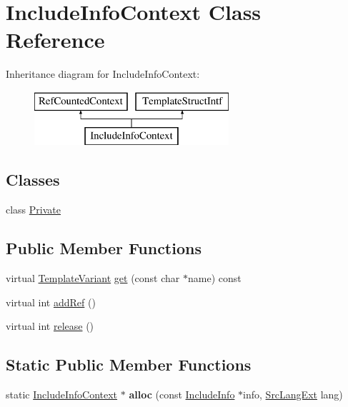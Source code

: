 \hypertarget{class_include_info_context}{}\section{Include\+Info\+Context Class Reference}
\label{class_include_info_context}
Inheritance diagram for Include\+Info\+Context\+:\begin{figure}[H]
\begin{center}
\leavevmode
\includegraphics[height=2.000000cm]{class_include_info_context}
\end{center}
\end{figure}
\subsection*{Classes}
\begin{DoxyCompactItemize}
\item 
class \mbox{\hyperlink{class_include_info_context_1_1_private}{Private}}
\end{DoxyCompactItemize}
\subsection*{Public Member Functions}
\begin{DoxyCompactItemize}
\item 
virtual \mbox{\hyperlink{class_template_variant}{Template\+Variant}} \mbox{\hyperlink{class_include_info_context_a16525103c9f37d8749b49211ae51e6e1}{get}} (const char $\ast$name) const
\item 
virtual int \mbox{\hyperlink{class_include_info_context_a0de1d814488fa964c23ec201832f7ca7}{add\+Ref}} ()
\item 
virtual int \mbox{\hyperlink{class_include_info_context_a85637ec320e16700349765ab31878ded}{release}} ()
\end{DoxyCompactItemize}
\subsection*{Static Public Member Functions}
\begin{DoxyCompactItemize}
\item 
\mbox{\label{class_include_info_context_abe28271dba740db999e5fdc0ed444547}} 
static \mbox{\hyperlink{class_include_info_context}{Include\+Info\+Context}} $\ast$ {\bfseries alloc} (const \mbox{\hyperlink{struct_include_info}{Include\+Info}} $\ast$info, \mbox{\hyperlink{types_8h_a9974623ce72fc23df5d64426b9178bf2}{Src\+Lang\+Ext}} lang)
\end{DoxyCompactItemize}


